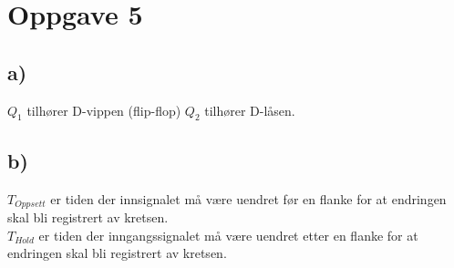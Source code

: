 \documentclass[12pt,norsk,a4paper]{article}
\begin{document}
\section{Oppgave 5}
\subsection{a)}
$Q_1$ tilhører D-vippen (flip-flop)
$Q_2$ tilhører D-låsen.
\subsection{b)}
$T_{Oppsett}$ er tiden der innsignalet må være uendret før en flanke for at endringen skal bli registrert av kretsen. \\
$T_{Hold}$ er tiden der inngangssignalet må være uendret etter en flanke for at endringen skal bli registrert av kretsen.
\end{document}
